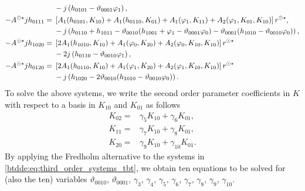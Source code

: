 \begin{equation}
\begin{aligned}
                         & -j\left(h_{0101} - \vartheta_{0001} \varphi_1\right), \\
-A^{\odot\star} jh_{0111} ={}& \left[A_1(h_{0101},K_{10}) + A_1(h_{0110},K_{01}) + A_1(\varphi_1,K_{11}) + A_2(\varphi_1,K_{01},K_{10})\right]r^{\odot\star}, \\
                         & -j\left(h_{0110} + h_{1011} - \vartheta_{0010} (h_{1001} + \varphi_1 - \vartheta_{0001} \varphi_0) - \vartheta_{0001} (h_{1010} - \vartheta_{0010} \varphi_0) \right), \\
-A^{\odot\star} jh_{1020} ={}& \left[2 A_1(h_{1010},K_{10}) + A_1(\varphi_0,K_{20}) + A_2(\varphi_0,K_{10},K_{10})\right]r^{\odot\star} \\
                         & - 2 j\left(h_{0110} - \vartheta_{0010} \varphi_1\right), \\
-A^{\odot\star} jh_{0120} ={}& \left[2 A_1(h_{0110},K_{10}) + A_1(\varphi_1,K_{20}) + A_2(\varphi_1,K_{10},K_{10})\right]r^{\odot\star} \\
                         & -j\left(h_{1020} - 2 \vartheta_{0010} (h_{1010} - \vartheta_{0010} \varphi_0)\right). \\
\end{aligned}
\end{equation}
To solve the above systems, we write the second order parameter coefficients in $K$ with respect to a basis in $K_{10}$ and $K_{01}$ as follows
\begin{equation}
\label{btdde:eq:second_order_parameter_coefficients_tbt}
\begin{aligned}
    K_{02} ={}& \gamma_5 K_{10} + \gamma_6 K_{01}, \\
    K_{11} ={}& \gamma_7 K_{10} + \gamma_8 K_{01}, \\
    K_{20} ={}& \gamma_9 K_{10} + \gamma_{10} K_{01}.
\end{aligned}
\end{equation}
By applying the Fredholm alternative to the systems in
\cref{btdde:eq:third_order_systems_tbt}, we obtain ten equations to be solved for (also the
ten) variables $\vartheta_{0010}$, $\vartheta_{0001}$, $\gamma_3$, $\gamma_4$,
$\gamma_5$, $\gamma_6$, $\gamma_7$, $\gamma_8$, $\gamma_9$, $\gamma_{10}$.

